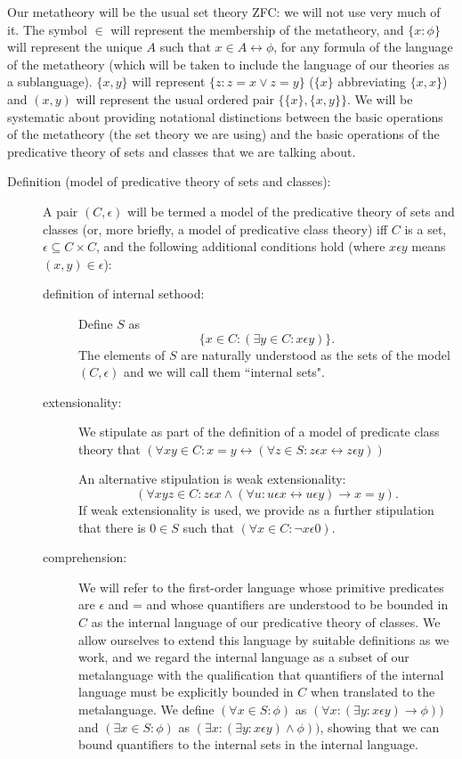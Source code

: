 \documentclass[12pt]{article}
\begin{document}
Our metatheory will be the usual set theory ZFC:  we will not use very much of it.   The symbol $\in$ will represent the membership of the metatheory, and $\{x : \phi\}$ will represent the unique $A$ such that $x \in A \leftrightarrow \phi$, for any formula of the language of the metatheory (which will be taken to include the language of our theories as a sublanguage).   $\{x,y\}$ will represent $\{z:z=x \vee z=y\}$ ($\{x\}$ abbreviating $\{x,x\}$) and $(x,y)$ will represent the usual ordered pair $\{\{x\},\{x,y\}\}$.  We will be systematic about providing notational distinctions between the basic operations of the metatheory (the set theory we are using) and the basic operations of the predicative theory of sets and classes that we are talking about.


\begin{description}
\item[Definition (model of predicative theory of sets and classes):]  A pair $(C,\epsilon)$ will be termed a model of the predicative theory of sets and classes (or, more briefly, a model of predicative class theory) iff $C$ is a set, $\epsilon \subseteq C \times C$, and the following additional conditions hold (where $x \epsilon y$ means $(x,y) \in \epsilon$):

\begin{description}

\item[definition of internal sethood:]  Define $S$ as $$\{x \in C:(\exists y \in C:x \epsilon y)\}.$$  The elements of $S$ are naturally understood as the sets of the model $(C,\epsilon)$ and we will call them ``internal sets".

\item[extensionality:]   We stipulate as part of the definition of a model of predicate class theory that $(\forall xy \in C:x=y \leftrightarrow (\forall z \in S:z \epsilon x \leftrightarrow z \epsilon y))$

An alternative stipulation is weak extensionality:  $$(\forall xyz \in C:  z \epsilon x \wedge (\forall u:u \epsilon x \leftrightarrow u \epsilon y) \rightarrow x=y).$$  If weak extensionality is used, we provide  as a further stipulation that there is 
$0 \in S$ such that $(\forall x \in C: \neg x \epsilon 0)$.

\item[comprehension:]  We will refer to the first-order language whose primitive predicates are $\epsilon$ and = and whose quantifiers are understood to be bounded in $C$ as the internal language of our predicative theory of classes.  We allow ourselves to extend this language by suitable definitions as we work, and we regard the internal language as a subset of our metalanguage with the qualification that quantifiers of the internal language must be explicitly bounded in $C$ when translated to the metalanguage.  We define $(\forall x \in S:\phi)$ as $(\forall x:(\exists y:x \epsilon y) \rightarrow \phi))$  and $(\exists x \in S:\phi)$ as $(\exists x:(\exists y:x \epsilon y) \wedge \phi))$, showing that we can bound quantifiers to the internal sets in the internal language.


\end{description}
\end{description}
\end{document}
